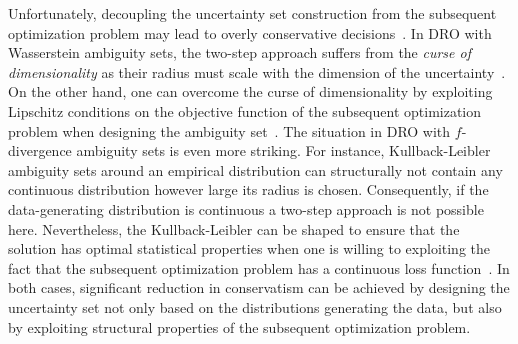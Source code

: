 \documentclass[11pt]{article}
\newcommand{\bsnote}[1]{\noindent\textcolor{red}{\texttt{Bartolomeo: #1}}}
\begin{document}
Unfortunately, decoupling the uncertainty set construction from the subsequent optimization problem  may lead to overly conservative decisions~\citep{reduce_conserve,gao2016distributionally}.
In \gls{DRO} with Wasserstein ambiguity sets, the two-step approach suffers from the {\it curse of dimensionality} as their radius must scale with the dimension of the uncertainty~\citep{wass_rate}.
On the other hand, one can overcome the curse of dimensionality by exploiting Lipschitz conditions on the objective function of the subsequent optimization problem when designing the ambiguity set~\citep{DBLP:gao2020}. 
The situation in \gls{DRO} with $f$-divergence ambiguity sets is even more striking.
For instance, Kullback-Leibler ambiguity sets around an empirical distribution can structurally not contain any continuous distribution however large its radius is chosen.
Consequently, if the data-generating distribution is continuous a two-step approach is not possible here. Nevertheless, the Kullback-Leibler can be shaped to ensure that the solution has optimal statistical properties when one is willing to exploiting the fact that the subsequent optimization problem has a continuous loss function~\citep{vanparys2021data}. 
In both cases, significant reduction in conservatism can be achieved by designing the uncertainty set not only based on the distributions generating the data, but also by exploiting structural properties of the subsequent optimization problem.
\end{document}
